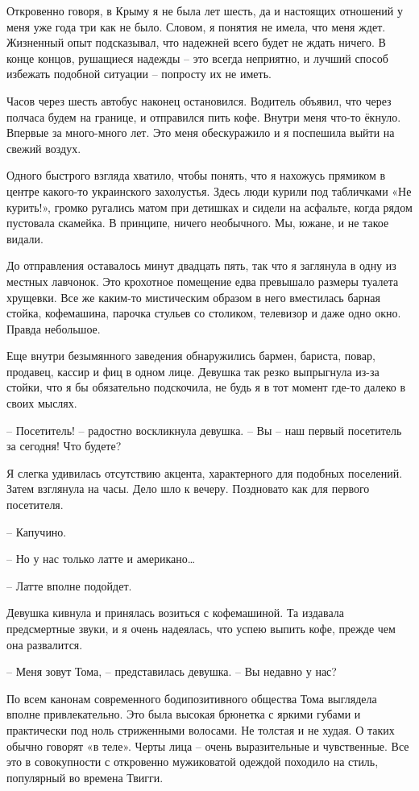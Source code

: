 \documentclass[
]{book}
\begin{document}
Откровенно говоря, в Крыму я не была лет шесть, да и настоящих отношений у меня уже года три как не было. Словом, я понятия не имела, что меня ждет. Жизненный опыт подсказывал, что надежней всего будет не ждать ничего. В конце концов, рушащиеся надежды -- это всегда неприятно, и лучший способ избежать подобной ситуации -- попросту их не иметь.

Часов через шесть автобус наконец остановился. Водитель объявил, что через полчаса будем на границе, и отправился пить кофе. Внутри меня что-то ёкнуло. Впервые за много-много лет. Это меня обескуражило и я поспешила выйти на свежий воздух.

Одного быстрого взгляда хватило, чтобы понять, что я нахожусь прямиком в центре какого-то украинского захолустья. Здесь люди курили под табличками «Не курить!», громко ругались матом при детишках и сидели на асфальте, когда рядом пустовала скамейка. В принципе, ничего необычного. Мы, южане, и не такое видали.

До отправления оставалось минут двадцать пять, так что я заглянула в одну из местных лавчонок. Это крохотное помещение едва превышало размеры туалета хрущевки. Все же каким-то мистическим образом в него вместилась барная стойка, кофемашина, парочка стульев со столиком, телевизор и даже одно окно. Правда небольшое.

Еще внутри безымянного заведения обнаружились бармен, бариста, повар, продавец, кассир и фиц в одном лице. Девушка так резко выпрыгнула из-за стойки, что я бы обязательно подскочила, не будь я в тот момент где-то далеко в своих мыслях.

-- Посетитель! -- радостно воскликнула девушка. -- Вы -- наш первый посетитель за сегодня! Что будете?

Я слегка удивилась отсутствию акцента, характерного для подобных поселений. Затем взглянула на часы. Дело шло к вечеру. Поздновато как для первого посетителя.

-- Капучино.

-- Но у нас только латте и американо\ldots{}

-- Латте вполне подойдет.

Девушка кивнула и принялась возиться с кофемашиной. Та издавала предсмертные звуки, и я очень надеялась, что успею выпить кофе, прежде чем она развалится.

-- Меня зовут Тома, -- представилась девушка. -- Вы недавно у нас?

По всем канонам современного бодипозитивного общества Тома выглядела вполне привлекательно. Это была высокая брюнетка с яркими губами и практически под ноль стриженными волосами. Не толстая и не худая. О таких обычно говорят «в теле». Черты лица -- очень выразительные и чувственные. Все это в совокупности с откровенно мужиковатой одеждой походило на стиль, популярный во времена Твигги.
\end{document}
